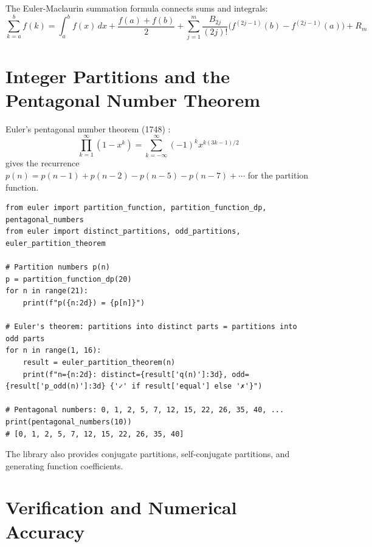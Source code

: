 \documentclass[11pt,a4paper]{article}
\theoremstyle{definition}
\begin{document}
The Euler-Maclaurin summation formula \cite{euler1768} connects sums and integrals:
\[
\sum_{k=a}^b f(k) = \int_a^b f(x)\,dx + \frac{f(a)+f(b)}{2} + \sum_{j=1}^m \frac{B_{2j}}{(2j)!}\bigl(f^{(2j-1)}(b)-f^{(2j-1)}(a)\bigr) + R_m
\]

\section{Integer Partitions and the Pentagonal Number Theorem}
\label{sec:partitions}

Euler's pentagonal number theorem (1748) \cite{euler1748}:
\[
\prod_{k=1}^\infty (1 - x^k) = \sum_{k=-\infty}^\infty (-1)^k x^{k(3k-1)/2}
\]
gives the recurrence $p(n) = p(n-1) + p(n-2) - p(n-5) - p(n-7) + \cdots$ for the partition function.

\begin{lstlisting}[caption={Partition function and pentagonal theorem}, label=lst:partitions]
from euler import partition_function, partition_function_dp, pentagonal_numbers
from euler import distinct_partitions, odd_partitions, euler_partition_theorem

# Partition numbers p(n)
p = partition_function_dp(20)
for n in range(21):
    print(f"p({n:2d}) = {p[n]}")

# Euler's theorem: partitions into distinct parts = partitions into odd parts
for n in range(1, 16):
    result = euler_partition_theorem(n)
    print(f"n={n:2d}: distinct={result['q(n)']:3d}, odd={result['p_odd(n)']:3d} {'✓' if result['equal'] else '✗'}")

# Pentagonal numbers: 0, 1, 2, 5, 7, 12, 15, 22, 26, 35, 40, ...
print(pentagonal_numbers(10))
# [0, 1, 2, 5, 7, 12, 15, 22, 26, 35, 40]
\end{lstlisting}

The library also provides conjugate partitions, self-conjugate partitions, and generating function coefficients.

\section{Verification and Numerical Accuracy}
\label{sec:verification}
\end{document}
